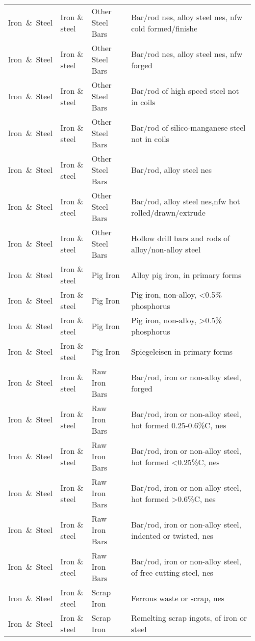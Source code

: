 \begin{appendices}
\begin{xltabular}{\textwidth}{|p{0.07\textwidth}|p{0.12\textwidth}|p{0.20\textwidth}|p{0.5\textwidth}|}
Iron\ \&\ Steel & Iron \& steel & Other Steel Bars & Bar/rod nes, alloy steel nes, nfw cold formed/finishe \\
Iron\ \&\ Steel & Iron \& steel & Other Steel Bars & Bar/rod nes, alloy steel nes, nfw forged \\
Iron\ \&\ Steel & Iron \& steel & Other Steel Bars & Bar/rod of high speed steel not in coils \\
Iron\ \&\ Steel & Iron \& steel & Other Steel Bars & Bar/rod of silico-manganese steel not in coils \\
Iron\ \&\ Steel & Iron \& steel & Other Steel Bars & Bar/rod, alloy steel nes \\
Iron\ \&\ Steel & Iron \& steel & Other Steel Bars & Bar/rod, alloy steel nes,nfw hot rolled/drawn/extrude \\
Iron\ \&\ Steel & Iron \& steel & Other Steel Bars & Hollow drill bars and rods of alloy/non-alloy steel \\
Iron\ \&\ Steel & Iron \& steel & Pig Iron & Alloy pig iron, in primary forms \\
Iron\ \&\ Steel & Iron \& steel & Pig Iron & Pig iron, non-alloy, <0.5\% phosphorus \\
Iron\ \&\ Steel & Iron \& steel & Pig Iron & Pig iron, non-alloy, >0.5\% phosphorus \\
Iron\ \&\ Steel & Iron \& steel & Pig Iron & Spiegeleisen in primary forms \\
Iron\ \&\ Steel & Iron \& steel & Raw Iron Bars & Bar/rod, iron or non-alloy steel, forged \\
Iron\ \&\ Steel & Iron \& steel & Raw Iron Bars & Bar/rod, iron or non-alloy steel, hot formed 0.25-0.6\%C, nes \\
Iron\ \&\ Steel & Iron \& steel & Raw Iron Bars & Bar/rod, iron or non-alloy steel, hot formed <0.25\%C, nes \\
Iron\ \&\ Steel & Iron \& steel & Raw Iron Bars & Bar/rod, iron or non-alloy steel, hot formed >0.6\%C, nes \\
Iron\ \&\ Steel & Iron \& steel & Raw Iron Bars & Bar/rod, iron or non-alloy steel, indented or twisted, nes \\
Iron\ \&\ Steel & Iron \& steel & Raw Iron Bars & Bar/rod, iron or non-alloy steel, of free cutting steel, nes \\
Iron\ \&\ Steel & Iron \& steel & Scrap Iron & Ferrous waste or scrap, nes \\
Iron\ \&\ Steel & Iron \& steel & Scrap Iron & Remelting scrap ingots, of iron or steel \\

\end{xltabular}
\end{appendices}
